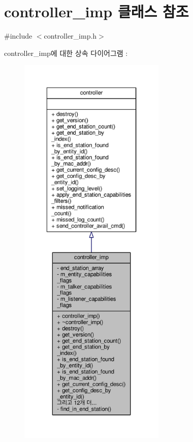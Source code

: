 \hypertarget{classavdecc__lib_1_1controller__imp}{}\section{controller\+\_\+imp 클래스 참조}
\label{classavdecc__lib_1_1controller__imp}


{\ttfamily \#include $<$controller\+\_\+imp.\+h$>$}



controller\+\_\+imp에 대한 상속 다이어그램 \+: 
\nopagebreak
\begin{figure}[H]
\begin{center}
\leavevmode
\includegraphics[height=550pt]{classavdecc__lib_1_1controller__imp__inherit__graph}
\end{center}
\end{figure}


